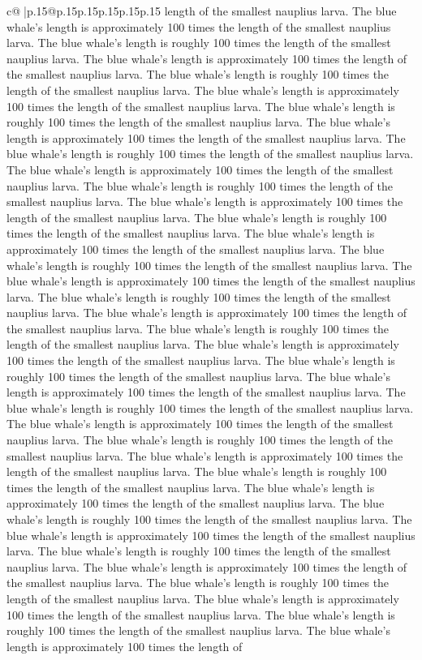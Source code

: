 \documentclass{article}
\begin{document}
{\begin{supertabular}{c@{$\;$}|p{.15\linewidth}@{}p{.15\linewidth}p{.15\linewidth}p{.15\linewidth}p{.15\linewidth}p{.15\linewidth}}
{{{length of the smallest nauplius larva. The blue whale's length is approximately 100 times the length of the smallest nauplius larva. The blue whale's length is roughly 100 times the length of the smallest nauplius larva. The blue whale's length is approximately 100 times the length of the smallest nauplius larva. The blue whale's length is roughly 100 times the length of the smallest nauplius larva. The blue whale's length is approximately 100 times the length of the smallest nauplius larva. The blue whale's length is roughly 100 times the length of the smallest nauplius larva. The blue whale's length is approximately 100 times the length of the smallest nauplius larva. The blue whale's length is roughly 100 times the length of the smallest nauplius larva. The blue whale's length is approximately 100 times the length of the smallest nauplius larva. The blue whale's length is roughly 100 times the length of the smallest nauplius larva. The blue whale's length is approximately 100 times the length of the smallest nauplius larva. The blue whale's length is roughly 100 times the length of the smallest nauplius larva. The blue whale's length is approximately 100 times the length of the smallest nauplius larva. The blue whale's length is roughly 100 times the length of the smallest nauplius larva. The blue whale's length is approximately 100 times the length of the smallest nauplius larva. The blue whale's length is roughly 100 times the length of the smallest nauplius larva. The blue whale's length is approximately 100 times the length of the smallest nauplius larva. The blue whale's length is roughly 100 times the length of the smallest nauplius larva. The blue whale's length is approximately 100 times the length of the smallest nauplius larva. The blue whale's length is roughly 100 times the length of the smallest nauplius larva. The blue whale's length is approximately 100 times the length of the smallest nauplius larva. The blue whale's length is roughly 100 times the length of the smallest nauplius larva. The blue whale's length is approximately 100 times the length of the smallest nauplius larva. The blue whale's length is roughly 100 times the length of the smallest nauplius larva. The blue whale's length is approximately 100 times the length of the smallest nauplius larva. The blue whale's length is roughly 100 times the length of the smallest nauplius larva. The blue whale's length is approximately 100 times the length of the smallest nauplius larva. The blue whale's length is roughly 100 times the length of the smallest nauplius larva. The blue whale's length is approximately 100 times the length of the smallest nauplius larva. The blue whale's length is roughly 100 times the length of the smallest nauplius larva. The blue whale's length is approximately 100 times the length of the smallest nauplius larva. The blue whale's length is roughly 100 times the length of the smallest nauplius larva. The blue whale's length is approximately 100 times the length of the smallest nauplius larva. The blue whale's length is roughly 100 times the length of the smallest nauplius larva. The blue whale's length is approximately 100 times the length of }}}
\end{supertabular}}
\end{document}
